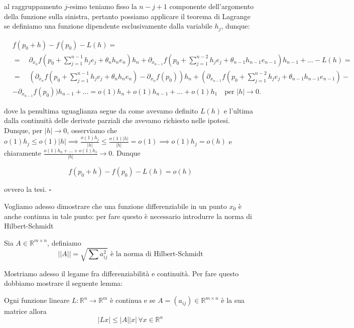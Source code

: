 al raggruppamento $j$-esimo teniamo fisso la $n-j+1$ componente dell'argomento della funzione sulla sinistra, pertanto possiamo applicare il teorema di Lagrange se definiamo una funzione dipendente esclusivamente dalla variabile $h_j$, dunque:

\[\begin{aligned}
    & f(p_0 + h) - f(p_0) - L(h) = \\
    & = \quad \partial_{x_n} f (p_0 + \sum_{j=1}^{n-1} h_j e_j + \theta_n h_n e_n) h_n + \partial_{x_{n-1}} f(p_0 + \sum_{j=1}^{n-2} h_j e_j + \theta_{n-1} h_{n-1} e_{n-1}) h_{n-1} + \ldots - L(h) = \\
    & = \quad \left(\partial_{x_n} f(p_0 + \sum_{j=1}^{n-1} h_j e_j + \theta_n h_n e_n) - \partial_{x_n} f(p_0)\right) h_n + \left(\partial_{x_{n-1}} f(p_0 + \sum_{j=1}^{n-2} h_j e_j + \theta_{n-1} h_{n-1} e_{n-1}) - \right. \\
    & -\partial_{x_{n-1}} f(p_0) \bigg) h_{n-1} + \ldots = o(1) h_n + o(1) h_{n-1} + \ldots + o(1) h_1 \quad \text{per } |h| \to 0.
\end{aligned}\]

dove la penultima uguaglianza segue da come avevamo definito $L(h)$ e l'ultima dalla continuità delle derivate parziali che avevamo richiesto nelle ipotesi. Dunque, per $|h| \to 0$, osserviamo che $o(1)h_j \leq o(1)|h| \implies \frac{o(1)h_j}{|h|} \leq \frac{o(1)|h|}{|h|} = o(1) \implies o(1)h_j = o(h)$ e chiaramente $\frac{o(1)h_n + \ldots + o(1)h_1}{|h|} \to 0$. Dunque 

$$f(p_0 + h) - f(p_0) - L(h) = o(h)$$

ovvero la tesi.
\hfill $\square$

Vogliamo adesso dimostrare che una funzione differenziabile in un punto $x_0$ è anche continua in tale punto: per fare questo è necessario introdurre la norma di Hilbert-Schmidt

\vspace{0.5cm}
\begin{definition}[\textcolor{blue}{norma di Hilbert-Schmidt}]
Sia $A \in \mathbb{R}^{m \times n}$, definiamo
$$
|| A || = \sqrt{\sum a_{ij}^2} \text{ è la norma di Hilbert-Schmidt}
$$
\end{definition}

Mostriamo adesso il legame fra differenziabilità e continuità. Per fare questo dobbiamo mostrare il seguente lemma:

\begin{lemma}
Ogni funzione lineare $L: \mathbb{R}^n \to \mathbb{R}^m$ è continua e se $A = (a_{ij}) \in \mathbb{R}^{m \times n}$ è la sua matrice allora 
$$
|Lx| \leq | A | |x|  \, \forall x \in \mathbb{R}^n
$$
\end{lemma}

